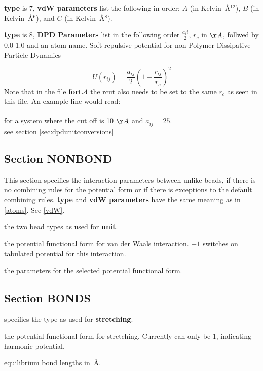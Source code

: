 \documentclass[12pt,letterpaper]{article}
\begin{document}
{\bf type} is 7, {\bf vdW parameters} list the following in
order: $A$ (in Kelvin~\AA$^{12}$), $B$ (in Kelvin~\AA$^6$),
and $C$ (in Kelvin~\AA$^8$).

{\bf type} is 8, {\bf DPD Parameters} list in the following order $\frac{a_ii}{2}$, $r_c$ in $\AA$, follwed by 0.0 1.0 and an atom name. Soft repulsive potential for non-Polymer Dissipative Particle Dynamics

\begin{equation}
U\left(r_{ij}\right) = \frac{a_{ij}}{2}\left(1-\frac{r_{ij}}{r_c}\right)^2
\end{equation}
Note that in the file {\bf fort.4} the rcut also needs to be set to the same $r_c$ as seen in this file. An example line would read: \\  \\ for a system where the cut off is 10 $\AA$ and $a_{ij} = 25$. \\ see section \ref{sec:dpdunitconversions}

\subsection{Section \textbf{NONBOND}}
\label{nonbond}
This section specifies the interaction parameters between
unlike beads, if there is no combining rules for the
potential form or if there is exceptions to the default
combining rules. {\bf type} and {\bf vdW parameters} have
the same meaning as in \ref{atoms}. See \ref{vdW}.

 the two bead types as used for {\bf
  unit}.

 the potential functional form for van
der Waals interaction. $-1$ switches on tabulated potential
for this interaction.

 the parameters for the
selected potential functional form.


\subsection{Section \textbf{BONDS}}
\label{bonds}

 specifies the type as used for {\bf
  stretching}.

 the potential functional form for
stretching. Currently can only be 1, indicating harmonic
potential.

 equilibrium bond lengths in~\AA.
\end{document}
